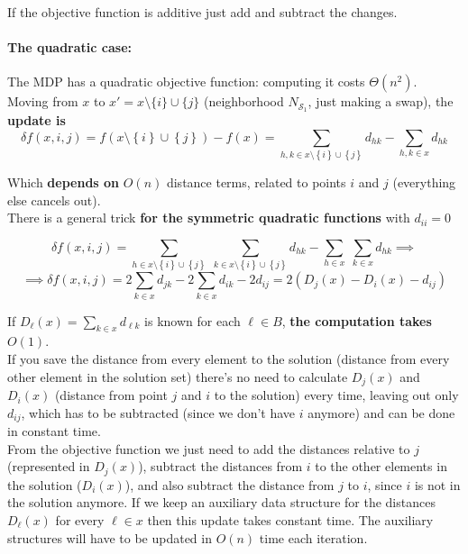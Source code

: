 If the objective function is additive just add and subtract the changes.\\

\newpage

\paragraph{The quadratic case:} The MDP has a quadratic objective function: computing it costs $\Theta (n^2)$.\\

Moving from $x$ to $x' = x \setminus \{i\} \cup \{j\}$ (neighborhood $N_{\mathcal{S}_1}$, just making a swap), the \textbf{update is}
$$ \delta f (x,i,j) = f \left(x \setminus \left\{i\right\} \cup \left\{j\right\}\right) - f(x) = \sum_{h,k \in x \setminus \left\{i\right\} \cup \left\{j\right\}} d_{hk} - \sum_{h,k \in x} d_{hk} $$

Which \textbf{depends on} $O (n)$ distance terms, related to points $i$ and $j$ (everything else cancels out).\\

There is a general trick \textbf{for the symmetric quadratic functions} with $d_{ii} = 0$

$$ \delta f (x,i,j) = \sum_{h \in x \setminus \left\{i\right\} \cup \left\{j\right\}} \; \sum_{k \in x \setminus \left\{i\right\} \cup \left\{j\right\}} d_{hk} - \sum_{h \in x} \; \sum_{k \in x} d_{hk} \implies $$
$$ \implies \delta f (x,i,j) = 2 \sum_{k \in x} d_{jk} - 2 \sum_{k \in x} d_{ik} - 2 d_{ij} = 2 \left(D_j (x) - D_i (x) - d_{ij}\right) $$

If $D_{\ell} (x) = \sum_{k \in x} d_{\ell k}$ is known for each $\ell \in B$, \textbf{the computation takes} $O (1)$.\\

If you save the distance from every element to the solution (distance from every other element in the solution set) there's no need to calculate $D_j (x)$ and $D_i (x)$ (distance from point $j$ and $i$ to the solution) every time, leaving out only $d_{ij}$, which has to be subtracted (since we don't have $i$ anymore) and can be done in constant time.\\

From the objective function we just need to add the distances relative to $j$ (represented in $D_j (x)$), subtract the distances from $i$ to the other elements in the solution ($D_i (x)$), and also subtract the distance from $j$ to $i$, since $i$ is not in the solution anymore. If we keep an auxiliary data structure for the distances $D_{\ell} (x)$ for every $\ell \in x$ then this update takes constant time. The auxiliary structures will have to be updated in $O (n)$ time each iteration. \\

